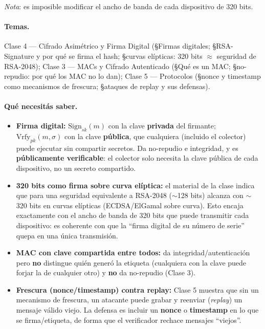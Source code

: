 \begin{consigna}
\emph{Nota}: es imposible modificar el ancho de banda de cada dispositivo de 320 bits.
\end{consigna}

\paragraph{Temas.}
Clase 4 --- Cifrado Asimétrico y Firma Digital (\S Firmas digitales; \S RSA-Signature y por
qué se firma el hash; \S curvas elípticas: 320 bits $\approx$ seguridad de RSA-2048);
Clase 3 --- MACs y Cifrado Autenticado (\S Qué es un MAC; \S no-repudio: por qué los MAC no
lo dan); Clase 5 --- Protocolos (\S nonce y timestamp como mecanismos de frescura;
\S ataques de replay y sus defensas).

\paragraph{Qué necesitás saber.}
\begin{itemize}
  \item \textbf{Firma digital:} $\mathrm{Sign}_{sk}(m)$ con la clave \textbf{privada} del
  firmante; $\mathrm{Vrfy}_{pk}(m,\sigma)$ con la clave \textbf{pública}, que cualquiera
  (incluido el colector) puede ejecutar sin compartir secretos. Da no-repudio e integridad,
  y es \textbf{públicamente verificable}: el colector solo necesita la clave pública de
  cada dispositivo, no un secreto compartido.
  \item \textbf{320 bits como firma sobre curva elíptica:} el material de la clase indica
  que para una seguridad equivalente a RSA-2048 ($\sim$128 bits) alcanza con
  $\sim$320 bits en curvas elípticas (ECDSA/ElGamal sobre curva). Esto encaja exactamente
  con el ancho de banda de 320 bits que puede transmitir cada dispositivo: es coherente con
  que la ``firma digital de su número de serie'' quepa en una única transmisión.
  \item \textbf{MAC con clave compartida entre todos:} da integridad/autenticación pero
  \textbf{no} distingue quién generó la etiqueta (cualquiera con la clave puede forjar la
  de cualquier otro) y \textbf{no} da no-repudio (Clase 3).
  \item \textbf{Frescura (nonce/timestamp) contra replay:} Clase 5 muestra que sin un
  mecanismo de frescura, un atacante puede grabar y reenviar (\emph{replay}) un mensaje
  válido viejo. La defensa es incluir un \textbf{nonce} o \textbf{timestamp} en lo que se
  firma/etiqueta, de forma que el verificador rechace mensajes ``viejos''.
\end{itemize}

